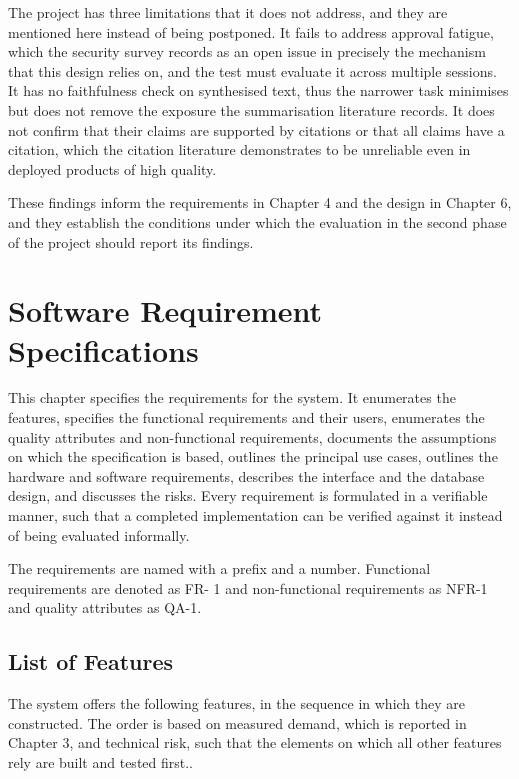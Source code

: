 \documentclass{FastFyp}
\begin{document}
The project has three limitations that it does not address, and they are mentioned here instead of being postponed. It fails to address approval fatigue, which the security survey records as an open issue in precisely the mechanism that this design relies on, and the test must evaluate it across multiple sessions. It has no faithfulness check on synthesised text, thus the narrower task minimises but does not remove the exposure the summarisation literature records. It does not confirm that their claims are supported by citations or that all claims have a citation, which the citation literature demonstrates to be unreliable even in deployed products of high quality.

These findings inform the requirements in Chapter 4 and the design in Chapter 6, and they establish the conditions under which the evaluation in the second phase of the project should report its findings.


\chapter{Software Requirement Specifications}
This chapter specifies the requirements for the system. It enumerates the features, specifies the functional requirements and their users, enumerates the quality attributes and non-functional requirements, documents the assumptions on which the specification is based, outlines the principal use cases, outlines the hardware and software requirements, describes the interface and the database design, and discusses the risks. Every requirement is formulated in a verifiable manner, such that a completed implementation can be verified against it instead of being evaluated informally.

The requirements are named with a prefix and a number. Functional requirements are denoted as FR- 1 and non-functional requirements as NFR-1 and quality attributes as QA-1.

\section{List of Features}
The system offers the following features, in the sequence in which they are constructed. The order is based on measured demand, which is reported in Chapter 3, and technical risk, such that the elements on which all other features rely are built and tested first..
\end{document}
